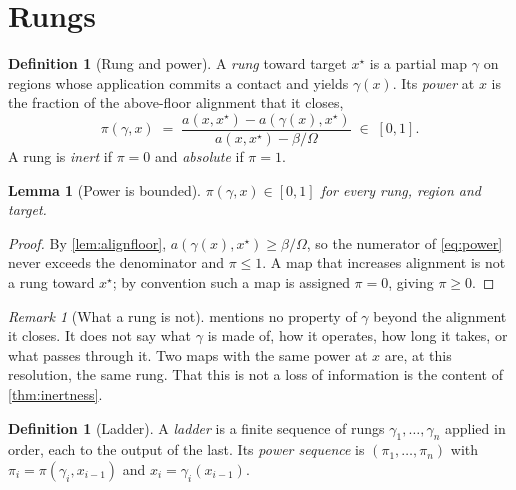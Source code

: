 \documentclass[11pt,twocolumn,a4paper]{article}
\theoremstyle{plain}
\newtheorem{lemma}[theorem]{Lemma}
\theoremstyle{definition}
\newtheorem{definition}[theorem]{Definition}
\theoremstyle{remark}
\newtheorem{remark}[theorem]{Remark}
\newcommand{\flo}{\beta}
\newcommand{\pow}{\pi}
\newcommand{\Tot}{\Omega}
\newcommand{\Rung}{\gamma}
\newcommand{\target}{x^{\star}}
\begin{document}
\section{Rungs}
\label{sec:rungs}

\begin{definition}[Rung and power]
\label{def:rung}
A \emph{rung} toward target $\target$ is a partial map $\Rung$ on regions whose
application commits a contact and yields $\Rung(x)$. Its \emph{power} at $x$ is
the fraction of the above-floor alignment that it closes,
\begin{equation}
\pow(\Rung, x) \;=\;
\frac{a(x,\target) - a(\Rung(x),\target)}{a(x,\target) - \flo/\Tot}
\;\in\; [0,1].
\label{eq:power}
\end{equation}
A rung is \emph{inert} if $\pow = 0$ and \emph{absolute} if $\pow = 1$.
\end{definition}

\begin{lemma}[Power is bounded]
\label{lem:powbound}
$\pow(\Rung,x) \in [0,1]$ for every rung, region and target.
\end{lemma}

\begin{proof}
By \cref{lem:alignfloor}, $a(\Rung(x),\target) \geq \flo/\Tot$, so the numerator
of \cref{eq:power} never exceeds the denominator and $\pow \leq 1$. A map that
increases alignment is not a rung toward $\target$; by convention such a map is
assigned $\pow = 0$, giving $\pow \geq 0$.
\end{proof}

\begin{remark}[What a rung is not]
\label{rem:rungisnot}
 mentions no property of $\Rung$ beyond the alignment it closes.
It does not say what $\Rung$ is made of, how it operates, how long it takes, or
what passes through it. Two maps with the same power at $x$ are, at this
resolution, the same rung. That this is not a loss of information is the content
of \cref{thm:inertness}.
\end{remark}

\begin{definition}[Ladder]
\label{def:ladder}
A \emph{ladder} is a finite sequence of rungs $\Rung_1,\dots,\Rung_n$ applied in
order, each to the output of the last. Its \emph{power sequence} is
$(\pow_1,\dots,\pow_n)$ with $\pow_i = \pow(\Rung_i, x_{i-1})$ and
$x_i = \Rung_i(x_{i-1})$.
\end{definition}
\end{document}
